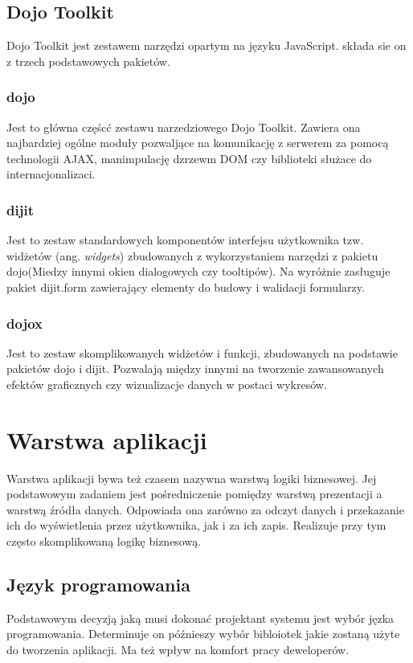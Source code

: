 \subsection[Dojo Toolkit][Dojo Toolkit]{Dojo Toolkit}
Dojo Toolkit jest zestawem narzędzi opartym na języku JavaScript. składa sie on z trzech podstawowych pakietów.

\subsubsection[dojo][dojo]{dojo}
Jest to główna częścć zestawu narzedziowego Dojo Toolkit. Zawiera ona najbardziej ogólne moduły pozwaljące na komunikację z serwerem za pomocą technologii AJAX, manimpulację dzrzewm DOM czy biblioteki służace do internacjonalizaci.

\subsubsection[dijit][dijit]{dijit}
Jest to zestaw standardowych komponentów interfejsu użytkownika tzw. widżetów (ang. \textit{widgets}) zbudowanych z wykorzystaniem narzędzi z pakietu dojo(Miedzy innymi okien dialogowych czy tooltipów). Na wyróżnie zasługuje pakiet dijit.form zawierający elementy do budowy i walidacji formularzy.
 
\subsubsection[dojox][dojox]{dojox}
Jest to zestaw skomplikowanych widżetów i funkcji, zbudowanych na podstawie pakietów dojo i dijit. Pozwalają między innymi na tworzenie zawansowanych efektów graficznych czy wizualizacje danych w postaci wykresów.
 
\section[Warstwa aplikacji][Warstwa aplikacji]{Warstwa aplikacji}
Warstwa aplikacji bywa też czasem nazywna warstwą logiki biznesowej. Jej podstawowym zadaniem jest pośredniczenie pomiędzy warstwą prezentacji a warstwą źródła danych. Odpowiada ona zarówno za odczyt danych i przekazanie ich do wyświetlenia przez użytkownika, jak i za ich zapis. Realizuje przy tym często skomplikowaną logikę biznesową.

\subsection[Język programowania][Język programowania]{Język programowania}
Podstawowym decyzją jaką musi dokonać projektant systemu jest wybór jęzka programowania. Determinuje on późnieszy wybór bibloiotek jakie zostaną użyte do tworzenia aplikacji. Ma też wpływ na komfort pracy deweloperów.

